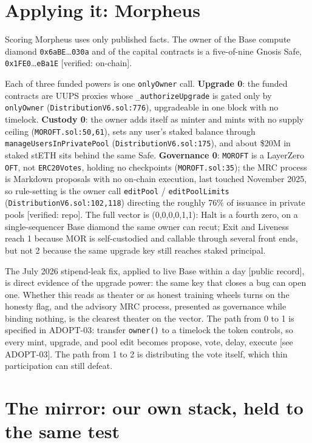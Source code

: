 \documentclass[11pt,a4paper]{article}
\newcommand{\code}[1]{\texttt{\small #1}}
\newcommand{\pv}[1]{{\color{muted}\sffamily\scriptsize[#1]}}
\begin{document}
\section{Applying it: Morpheus}

Scoring Morpheus uses only published facts. The owner of the Base compute diamond
\code{0x6aBE}\dots\code{030a} and of the capital contracts is a five-of-nine Gnosis
Safe, \code{0x1FE0}\dots\code{eBa1E} \pv{verified: on-chain}.

Each of three funded powers is one \code{onlyOwner} call. \textbf{Upgrade 0}: the
funded contracts are UUPS proxies whose \code{\_authorizeUpgrade} is gated only by
\code{onlyOwner} (\code{DistributionV6.sol:776}), upgradeable in one block with no
timelock. \textbf{Custody 0}: the owner adds itself as minter and mints with no
supply ceiling (\code{MOROFT.sol:50,61}), sets any user's staked balance through
\code{manageUsersInPrivatePool} (\code{DistributionV6.sol:175}), and about \$20M in
staked stETH sits behind the same Safe. \textbf{Governance 0}: \code{MOROFT} is a
LayerZero \code{OFT}, not \code{ERC20Votes}, holding no checkpoints
(\code{MOROFT.sol:35}); the MRC process is Markdown proposals with no on-chain
execution, last touched November 2025, so rule-setting is the owner call
\code{editPool} / \code{editPoolLimits} (\code{DistributionV6.sol:102,118})
directing the roughly 76\% of issuance in private pools \pv{verified: repo}. The
full vector is (0,0,0,0,1,1): Halt is a fourth zero, on a single-sequencer Base
diamond the same owner can recut; Exit and Liveness reach 1 because MOR is
self-custodied and callable through several front ends, but not 2 because the same
upgrade key still reaches staked principal.

The July 2026 stipend-leak fix, applied to live Base within a day
\pv{public record}, is direct evidence of the upgrade power: the same key that
closes a bug can open one. Whether this reads as theater or as honest training
wheels turns on the honesty flag, and the advisory MRC process, presented as
governance while binding nothing, is the clearest theater on the vector. The path
from 0 to 1 is specified in ADOPT-03: transfer \code{owner()} to a timelock the
token controls, so every mint, upgrade, and pool edit becomes propose, vote, delay,
execute \pv{see ADOPT-03}. The path from 1 to 2 is distributing the vote itself,
which thin participation can still defeat.

\section{The mirror: our own stack, held to the same test}
\end{document}
